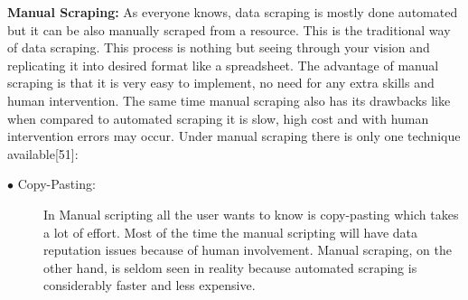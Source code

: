 {\bf Manual Scraping:} As everyone knows, data scraping is mostly done automated but it can be also manually scraped from a resource. This is the traditional way of data scraping. This process is nothing but seeing through your vision and replicating it into desired format like a spreadsheet. The advantage of manual scraping is that it is very easy to implement, no need for any extra skills and human intervention. The same time manual scraping also has its drawbacks like when compared to automated scraping it is slow, high cost and with human intervention errors may occur. Under manual scraping there is only one technique available[51]:
\begin{description}
	\item [$\bullet$ Copy-Pasting:] In Manual scripting all the user wants to know is copy-pasting which takes a lot of effort. Most of the time the manual scripting will have data reputation issues because of human involvement. Manual scraping, on the other hand, is seldom seen in reality because automated scraping is considerably faster and less expensive.
\end{description}

